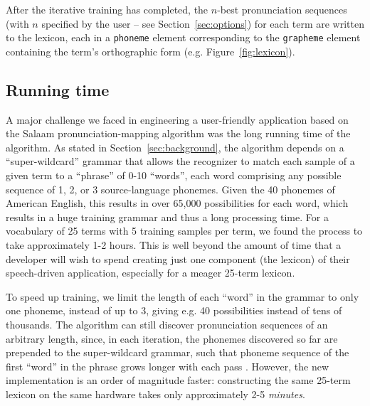 \documentclass[11pt]{article}
\begin{document}

After the iterative training has completed, the $n$-best pronunciation sequences (with $n$ specified by the user -- see Section~\ref{sec:options}) for each term are written to the lexicon, each in a \texttt{phoneme} element corresponding to the \texttt{grapheme} element containing the term's orthographic form (e.g. Figure~\ref{fig:lexicon}).

\subsection{Running time}
\label{sec:runningtime}

A major challenge we faced in engineering a user-friendly application based on the Salaam pronunciation-mapping algorithm \cite{Qiao10} was the long running time of the algorithm. As stated in Section~\ref{sec:background}, the algorithm 
depends on a ``super-wildcard'' grammar that allows the recognizer to match each sample of a given term to a ``phrase'' of 0-10 ``words'', each word comprising any possible sequence of 1, 2, or 3 source-language phonemes. Given the 40 phonemes of American English, this results in over 65,000 possibilities for each word, which results in a huge training grammar and thus a long processing time. For a vocabulary of 25 terms with 5 training samples per term, we found the process to take approximately 1-2 hours. This is well beyond the amount of time that a developer will wish to spend creating just one component (the lexicon) of their speech-driven application, especially for a meager 25-term lexicon. 

To speed up training, we limit the length of each ``word'' in the grammar to only one phoneme, instead of up to 3, giving e.g. 40 possibilities instead of tens of thousands. 
The algorithm can still discover pronunciation sequences of an arbitrary length, since, in each iteration, the phonemes discovered so far are prepended to the super-wildcard grammar, such that phoneme sequence of the first ``word'' in the phrase grows longer with each pass \cite[p.~4]{Qiao10}. 
However, the new implementation is an order of magnitude faster: constructing the same 25-term lexicon on the same hardware takes only approximately 2-5 \textit{minutes}. 
\end{document}

